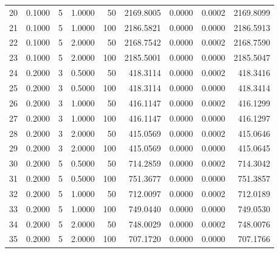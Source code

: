 \begin{table}
\begin{tabular}{lrrrrrrrr}
20 & 0.1000 & 5 & 1.0000 & 50 & 2169.8005 & 0.0000 & 0.0002 & 2169.8099 \\
21 & 0.1000 & 5 & 1.0000 & 100 & 2186.5821 & 0.0000 & 0.0000 & 2186.5913 \\
22 & 0.1000 & 5 & 2.0000 & 50 & 2168.7542 & 0.0000 & 0.0002 & 2168.7590 \\
23 & 0.1000 & 5 & 2.0000 & 100 & 2185.5001 & 0.0000 & 0.0000 & 2185.5047 \\
24 & 0.2000 & 3 & 0.5000 & 50 & 418.3114 & 0.0000 & 0.0002 & 418.3416 \\
25 & 0.2000 & 3 & 0.5000 & 100 & 418.3114 & 0.0000 & 0.0000 & 418.3414 \\
26 & 0.2000 & 3 & 1.0000 & 50 & 416.1147 & 0.0000 & 0.0002 & 416.1299 \\
27 & 0.2000 & 3 & 1.0000 & 100 & 416.1147 & 0.0000 & 0.0000 & 416.1297 \\
28 & 0.2000 & 3 & 2.0000 & 50 & 415.0569 & 0.0000 & 0.0002 & 415.0646 \\
29 & 0.2000 & 3 & 2.0000 & 100 & 415.0569 & 0.0000 & 0.0000 & 415.0645 \\
30 & 0.2000 & 5 & 0.5000 & 50 & 714.2859 & 0.0000 & 0.0002 & 714.3042 \\
31 & 0.2000 & 5 & 0.5000 & 100 & 751.3677 & 0.0000 & 0.0000 & 751.3857 \\
32 & 0.2000 & 5 & 1.0000 & 50 & 712.0097 & 0.0000 & 0.0002 & 712.0189 \\
33 & 0.2000 & 5 & 1.0000 & 100 & 749.0440 & 0.0000 & 0.0000 & 749.0530 \\
34 & 0.2000 & 5 & 2.0000 & 50 & 748.0029 & 0.0000 & 0.0002 & 748.0076 \\
35 & 0.2000 & 5 & 2.0000 & 100 & 707.1720 & 0.0000 & 0.0000 & 707.1766 \\
\bottomrule
\end{tabular}
\end{table}
